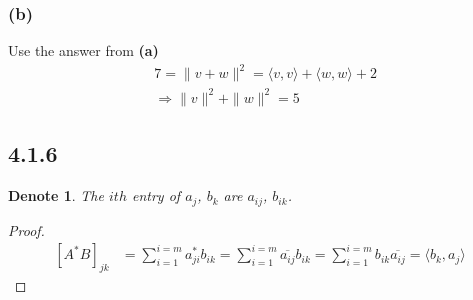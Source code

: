 \documentclass{article}
\newtheorem*{denote}{Denote}
\newtheorem*{proof}{Proof}
\begin{document}
\subsubsection*{(b)}
Use the answer from \textbf{(a)}
\begin{equation*}
    \begin{split}
        & 7 = \|v + w\|^2 = \langle{v}, {v} \rangle + \langle{w}, {w} \rangle + 2 \\
        & \Rightarrow \|v\|^2 + \|w\|^2 = 5
    \end{split}
\end{equation*}

\subsection*{4.1.6}
\begin{denote}
    The $ith$ entry of $a_j$, $b_k$ are $a_{ij}$, $b_{ik}$.
\end{denote}
\begin{proof}
    \begin{equation*}
        \begin{split}
        [A^*B]_{jk} &= \sum_{i=1}^{i=m}a^*_{ji}b_{ik} = \sum_{i=1}^{i=m} \overline{a_{ij}}b_{ik} = \sum_{i=1}^{i=m} b_{ik}\overline{a_{ij}} = \langle b_k, a_j \rangle 
        \end{split}
    \end{equation*}
\end{proof}
\end{document}
